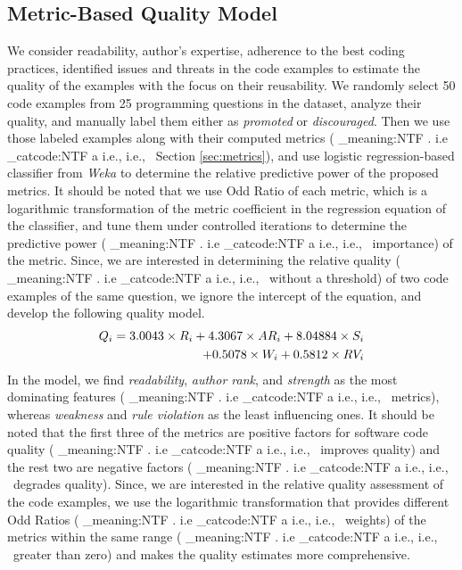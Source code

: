 \documentclass{sig-alternate}
\makeatletter
\newcommand\latinabbrev[1]{
  \peek_meaning:NTF . {%
    #1\@}%
  { \peek_catcode:NTF a {%
      #1., \@ }%
    {#1., \@}}}
\def\ie{\latinabbrev{i.e}}
\makeatother
\begin{document}
\subsection{Metric-Based Quality Model}
We consider readability, author's expertise, adherence to the best coding practices, identified issues and threats in the code examples to estimate the quality of the examples with the focus on their reusability. We randomly select 50 code examples from 25 programming questions in the dataset, analyze their quality, and manually label them either as \emph{promoted} or \emph{discouraged}. Then we use those labeled examples along with their computed metrics (\ie\ Section \ref{sec:metrics}), and use logistic regression-based classifier from \emph{Weka} to determine the relative predictive power of the proposed metrics. It should be noted that we use Odd Ratio \cite{specmining} of each metric, which is a logarithmic transformation of the metric coefficient in the regression equation of the classifier, and tune them under controlled iterations to determine the predictive power (\ie\ importance) of the metric. Since, we are interested in determining the relative quality (\ie\ without a threshold) of two code examples of the same question, we ignore the intercept of the equation, and develop the following quality model. 
\begin{equation}\label{eq:model}
\vspace{-.1cm}
\begin{split}
Q_{i}=3.0043\times R_{i}+4.3067\times AR_{i}
+8.04884\times S_{i}\\+0.5078\times W_{i}+0.5812\times RV_{i}
\end{split}
\vspace{-.1cm}
\end{equation}
In the model, we find \emph{readability}, \emph{author rank}, and \emph{strength} as the most dominating features (\ie\ metrics), whereas \emph{weakness} and \emph{rule violation} as the least influencing ones. It should be noted that the first three of the metrics are positive factors for software code quality (\ie\ improves quality) and the rest two are negative factors (\ie\ degrades quality). Since, we are interested in the relative quality assessment of the code examples, we use the logarithmic transformation that provides different Odd Ratios (\ie\ weights) of the metrics within the same range (\ie\ greater than zero) and makes the quality estimates more comprehensive.
\end{document}
